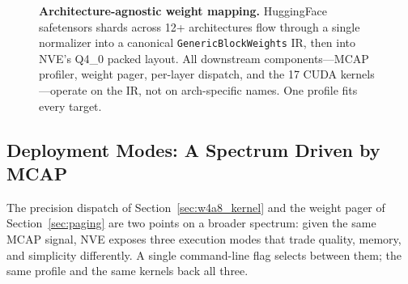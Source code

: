 \documentclass{article}
\begin{document}
\begin{figure}[H]
{%
}
\caption{\textbf{Architecture-agnostic weight mapping.} HuggingFace safetensors shards
across 12+ architectures flow through a single normalizer into a canonical
\texttt{GenericBlockWeights} IR, then into NVE's Q4\_0 packed layout. All downstream
components---MCAP profiler, weight pager, per-layer dispatch, and the 17 CUDA
kernels---operate on the IR, not on arch-specific names. One profile fits every target.}
\label{fig:weight_mapping}
\end{figure}


\subsection{Deployment Modes: A Spectrum Driven by MCAP}
\label{sec:deployment_modes}

The precision dispatch of Section~\ref{sec:w4a8_kernel} and the weight pager of
Section~\ref{sec:paging} are two points on a broader spectrum: given the same MCAP signal,
NVE exposes three execution modes that trade quality, memory, and simplicity
differently. A single command-line flag selects between them; the same profile and the
same kernels back all three.
\end{document}
